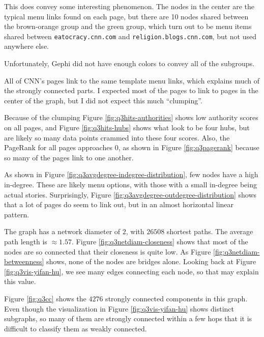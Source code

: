 \documentclass[letterpaper,11pt]{article}
\begin{document}
This does convey some interesting phenomenon.  The nodes in the center are the typical menu links found on each page, but there are 10 nodes shared between the brown-orange group and the green group, which turn out to be menu items shared between \verb+eatocracy.cnn.com+ and \verb+religion.blogs.cnn.com+, but not used anywhere else.

Unfortunately, Gephi did not have enough colors to convey all of the subgroups.

All of CNN's pages link to the same template menu links, which explains much of the strongly connected parts.  I expected most of the pages to link to pages in the center of the graph, but I did not expect this much ``clumping''.

Because of the clumping Figure \ref{fig:q3hits-authorities} shows low authority scores on all pages, and Figure \ref{fig:q3hits-hubs} shows what look to be four hubs, but are likely so many data points crammed into these four scores.  Also, the PageRank for all pages approaches $0$, as shown in Figure \ref{fig:q3pagerank} because so many of the pages link to one another.

As shown in Figure \ref{fig:q3avgdegree-indegree-distribution}, few nodes have a high in-degree.  These are likely menu options, with those with a small in-degree being actual stories.  Surprisingly, Figure \ref{fig:q3avgdegree-outdegree-distribution} shows that a lot of pages do seem to link out, but in an almost horizontal linear pattern.

The graph has a network diameter of $2$, with $26508$ shortest paths.  The average path length is $\approx 1.57$.  Figure \ref{fig:q3netdiam-closeness} shows that most of the nodes are so connected that their closeness is quite low.  As Figure \ref{fig:q3netdiam-betweenness} shows, none of the nodes are bridges alone.  Looking back at Figure \ref{fig:q3vis-yifan-hu}, we see many edges connecting each node, so that may explain this value.

Figure \ref{fig:q3cc} shows the $4276$ strongly connected components in this graph.  Even though the visualization in Figure \ref{fig:q3vis-yifan-hu} shows distinct subgraphs, so many of them are strongly connected within a few hops that it is difficult to classify them as weakly connected.
\end{document}
